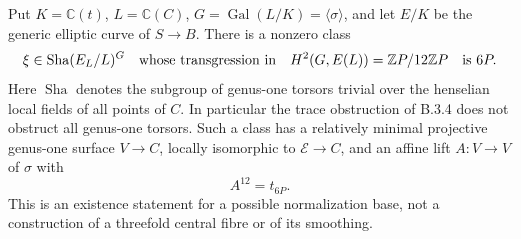 \begin{proposition}\label{push:src:B.3.6}\label{push:B36}
Put $K=\mathbb C(t)$, $L=\mathbb C(C)$,
$G=\operatorname{Gal}(L/K)=\langle\sigma\rangle$,
and let $E/K$ be the generic elliptic
curve of $S\to B$. There is a nonzero
class
\[
 \xi\in\operatorname{Sha}(E_L/L)^G
 \quad\hbox{whose transgression in}\quad
 H^2(G,E(L))=\mathbb ZP/12\mathbb ZP
 \quad\hbox{is }6P.
\]
Here $\operatorname{Sha}$ denotes the
subgroup of genus-one torsors trivial
over the henselian local fields of all
points of $C$.
In particular the trace obstruction of
B.3.4 does not obstruct all genus-one
torsors. Such a class has a relatively
minimal projective genus-one surface
$V\to C$, locally isomorphic to
$\mathscr E\to C$, and an affine lift
$A:V\to V$ of $\sigma$ with
\[
 A^{12}=t_{6P}.
\]
This is an existence statement for a
possible normalization base, not a
construction of a threefold central
fibre or of its smoothing.
\end{proposition}
